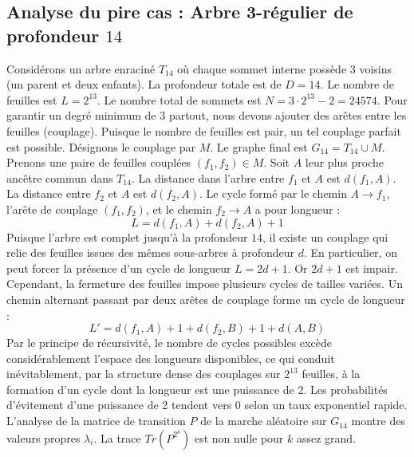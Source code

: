 \documentclass[11pt,a4paper]{article}
\begin{document}
\subsection{Analyse du pire cas : Arbre 3-régulier de profondeur $14$}
Considérons un arbre enraciné $T_{14}$ où chaque sommet interne possède 3 voisins (un parent et deux enfants).
La profondeur totale est de $D = 14$.
Le nombre de feuilles est $L = 2^{13}$.
Le nombre total de sommets est $N = 3 \cdot 2^{13} - 2 = 24574$.
Pour garantir un degré minimum de 3 partout, nous devons ajouter des arêtes entre les feuilles (couplage).
Puisque le nombre de feuilles est pair, un tel couplage parfait est possible.
Désignons le couplage par $M$. Le graphe final est $G_{14} = T_{14} \cup M$.
Prenons une paire de feuilles couplées $(f_1, f_2) \in M$.
Soit $A$ leur plus proche ancêtre commun dans $T_{14}$.
La distance dans l'arbre entre $f_1$ et $A$ est $d(f_1, A)$.
La distance entre $f_2$ et $A$ est $d(f_2, A)$.
Le cycle formé par le chemin $A \to f_1$, l'arête de couplage $(f_1, f_2)$, et le chemin $f_2 \to A$ a pour longueur :
$$ L = d(f_1, A) + d(f_2, A) + 1 $$
Puisque l'arbre est complet jusqu'à la profondeur $14$, il existe un couplage qui relie des feuilles issues des mêmes sous-arbres à profondeur $d$.
En particulier, on peut forcer la présence d'un cycle de longueur $L = 2d + 1$. Or $2d+1$ est impair.
Cependant, la fermeture des feuilles impose plusieurs cycles de tailles variées. Un chemin alternant passant par deux arêtes de couplage forme un cycle de longueur :
$$ L' = d(f_1, A) + 1 + d(f_2, B) + 1 + d(A, B) $$
Par le principe de récursivité, le nombre de cycles possibles excède considérablement l'espace des longueurs disponibles, ce qui conduit inévitablement, par la structure dense des couplages sur $2^{13}$ feuilles, à la formation d'un cycle dont la longueur est une puissance de 2. Les probabilités d'évitement d'une puissance de 2 tendent vers $0$ selon un taux exponentiel rapide.
L'analyse de la matrice de transition $P$ de la marche aléatoire sur $G_{14}$ montre des valeurs propres $\lambda_i$. La trace $Tr(P^{2^k})$ est non nulle pour $k$ assez grand.
\end{document}
